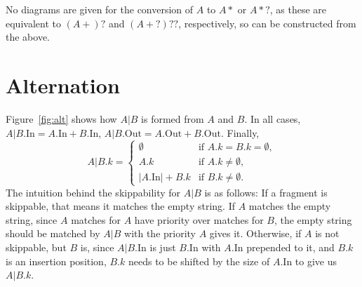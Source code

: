 \documentclass{article}
\newcommand*{\In}{\mathrm{In}}
\newcommand*{\Out}{\mathrm{Out}}
\begin{document}
No diagrams are given for the conversion of $A$ to $A*$ or $A*?$, as these are equivalent to $(A+)?$ and $(A+?)??$, respectively, so can be constructed from the above. 

\section{Alternation}

Figure~\ref{fig:alt} shows how $A|B$ is formed from $A$ and $B$. In all cases, $A|B.\In = A.\In + B.\In$, $A|B.\Out = A.\Out + B.\Out$. Finally,
\[ A|B.k = \begin{cases}
  \emptyset & \text{if } A.k = B.k = \emptyset,\\
  A.k       & \text{if } A.k \ne \emptyset,\\
  \lvert A.\In\rvert + B.k & \text{if } B.k \ne \emptyset.
\end{cases}\]
The intuition behind the skippability for $A|B$ is as follows: If a fragment is skippable, that means it matches the empty string. If $A$ matches the empty string, since $A$ matches for $A$ have priority over matches for $B$, the empty string should be matched by $A|B$ with the priority $A$ gives it. Otherwise, if $A$ is not skippable, but $B$ is, since $A|B.\In$ is just $B.\In$ with $A.\In$ prepended to it, and $B.k$ is an insertion position, $B.k$ needs to be shifted by the size of $A.\In$ to give us $A|B.k$.
\end{document}
